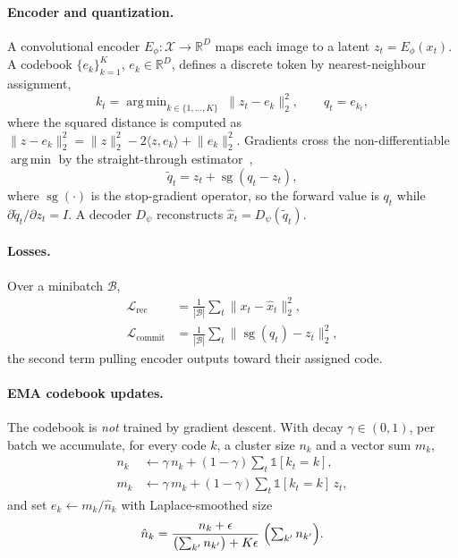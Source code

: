 \documentclass[twocolumn,10pt]{article}
\DeclareMathOperator*{\argmin}{arg\,min}
\newcommand{\sg}{\operatorname{sg}}
\newcommand{\R}{\mathbb{R}}
\newcommand{\Lcal}{\mathcal{L}}
\begin{document}
\paragraph{Encoder and quantization.}
A convolutional encoder $E_\phi:\mathcal{X}\to\R^{D}$ maps each image to a
latent $z_t=E_\phi(x_t)$. A codebook $\{e_k\}_{k=1}^{K}$, $e_k\in\R^{D}$,
defines a discrete token by nearest-neighbour assignment,
\begin{equation}
k_t=\argmin_{k\in\{1,\dots,K\}}\;\lVert z_t-e_k\rVert_2^2 ,
\qquad q_t=e_{k_t},
\label{eq:quantize}
\end{equation}
where the squared distance is computed as
$\lVert z-e_k\rVert_2^2=\lVert z\rVert_2^2-2\langle z,e_k\rangle+\lVert
e_k\rVert_2^2$. Gradients cross the non-differentiable $\argmin$ by the
straight-through estimator~\cite{bengio2013},
\begin{equation}
\tilde q_t = z_t + \sg(q_t-z_t),
\label{eq:ste}
\end{equation}
where $\sg(\cdot)$ is the stop-gradient operator, so the forward value is
$q_t$ while $\partial\tilde q_t/\partial z_t=I$. A decoder $D_\psi$
reconstructs $\hat x_t=D_\psi(\tilde q_t)$.

\paragraph{Losses.}
Over a minibatch $\mathcal{B}$,
\begin{align}
\Lcal_{\mathrm{rec}} &= \tfrac{1}{|\mathcal{B}|}\textstyle\sum_{t}
   \lVert x_t-\hat x_t\rVert_2^2 ,\\
\Lcal_{\mathrm{commit}} &= \tfrac{1}{|\mathcal{B}|}\textstyle\sum_{t}
   \lVert \sg(q_t)-z_t\rVert_2^2 ,
\label{eq:vqlosses}
\end{align}
the second term pulling encoder outputs toward their assigned code.

\paragraph{EMA codebook updates.}
The codebook is \emph{not} trained by gradient descent. With decay
$\gamma\in(0,1)$, per batch we accumulate, for every code $k$, a cluster size
$n_k$ and a vector sum $m_k$,
\begin{align}
n_k &\leftarrow \gamma\,n_k+(1-\gamma)\!\textstyle\sum_{t}\mathbb{1}[k_t=k],\\
m_k &\leftarrow \gamma\,m_k+(1-\gamma)\!\textstyle\sum_{t}\mathbb{1}[k_t=k]\,z_t,
\end{align}
and set $e_k\leftarrow m_k/\hat n_k$ with Laplace-smoothed size
\begin{equation}
\hat n_k=\frac{n_k+\epsilon}{\bigl(\sum_{k'}n_{k'}\bigr)+K\epsilon}
        \;\Bigl(\textstyle\sum_{k'}n_{k'}\Bigr).
\end{equation}
\end{document}
